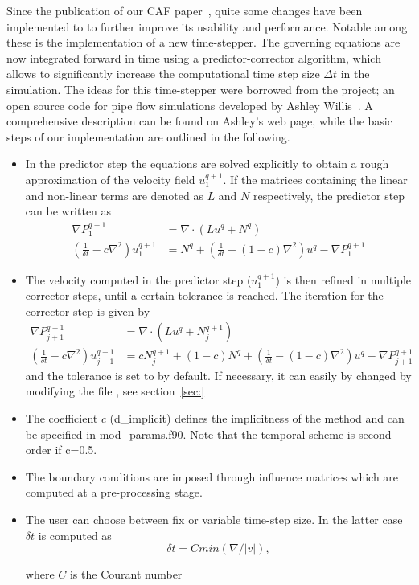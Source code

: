 \documentclass[a4paper, 11pt, DIV=11]{scrartcl}
\begin{document}
Since the publication of our CAF paper~\cite{Shi2015}, quite some changes have been
implemented to \nsc to further improve its usability and performance. Notable among
these is the implementation of a new time-stepper. The governing equations are now
integrated forward in time using a predictor-corrector algorithm, which allows to
significantly increase the computational time step size $\Delta t$ in the simulation.
The ideas for this time-stepper were borrowed from the \opf project; an open source
code for pipe flow simulations developed by Ashley Willis~\cite{Willis2017}. A
comprehensive description can be found on Ashley's web page, while the basic steps
of our implementation are outlined in the following.
\begin{itemize}

\item
In the predictor step the equations are solved explicitly to obtain a rough
approximation of the velocity field $u_1^{q+1}$. If the matrices containing
the linear and non-linear terms are denoted as $L$ and $N$ respectively, the
predictor step can be written as
\begin{align*}
\nabla P_1^{q+1} & = \nabla\cdot(Lu^q+N^q)\\
\left(\frac{1}{\delta t} - c\nabla^2\right) u_1^{q+1} & =
N^q + \left(\frac{1}{\delta t}-(1-c)\nabla^2\right) u^{q} - \nabla P_1^{q+1}
\end{align*}

\item
The velocity computed in the predictor step ($u_1^{q+1}$) is then refined in
multiple corrector steps, until a certain tolerance is reached. The iteration
for the corrector step is given by
\begin{align*}
\nabla P_{j+1}^{q+1} & = \nabla\cdot\left(Lu^q+N_j^{q+1}\right)\\
\left(\frac{1}{\delta t}-c \nabla^2\right) u_{j+1}^{q+1} & =
c N_j^{q+1} + \left(1-c\right)N^q + \left( \frac{1}{\delta t} -
\left(1-c \right) \nabla^2 \right) u^{q} - \nabla P_{j+1}^{q+1}
\end{align*}
and the tolerance is set to  by default. If
necessary, it can easily by changed by modifying the file ,
see section~\ref{sec:}

  

\item The coefficient $c$ (d\_implicit) defines the implicitness of the method and can be specified
  in mod\_params.f90. Note that the temporal scheme is second-order if c=0.5.

\item The boundary conditions are imposed through influence matrices which are 
  computed at a pre-processing stage.


  \item The user can choose between fix or variable time-step size. In the latter case $\delta t$ is computed as
  \begin{equation}
 \delta t = C min (\nabla / |v|),
  \end{equation}
  
  where $C$ is the Courant number
  

\end{itemize}
\end{document}
